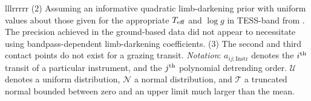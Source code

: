 \begin{deluxetable*}{lllrrrrr}
{%
%
(2) Assuming an informative quadratic limb-darkening prior with
uniform values about those given for the appropriate $T_{\rm eff}$ and
$\log g$ in TESS-band from \citet{claret_limb_2017}.  The precision
achieved in the ground-based data did not appear to necessitate using
bandpass-dependent limb-darkening coefficients.
(3) The second and third contact points do not exist for a grazing transit.
{\it Notation}:
$a_{ij;\mathrm{Instr}}$ denotes the $i^{\rm th}$ transit of a
particular instrument, and the $j^{\rm th}$ polynomial detrending
order.
$\mathcal{U}$ denotes a uniform distribution,
$\mathcal{N}$ a normal distribution, and
$\mathcal{T}$ a truncated normal bounded between zero and an upper limit much larger than the mean.
}
\vspace{0cm}
\end{deluxetable*}
